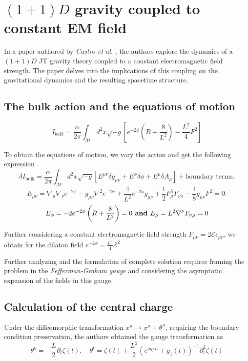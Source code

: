 \section{$(1+1)D$ gravity coupled to constant EM field  \cite{castro2019}}
\label{castro-paper}

In a paper authored by \textit{Castro et al.} \cite{castro2019}, the authors explore the dynamics of a $(1+1)D$ JT gravity theory coupled to a constant electromagnetic field strength. The paper delves into the implications of this coupling on the gravitational dynamics and the resulting spacetime structure. 

\subsection{The bulk action and the equations of motion}
\[ I_{bulk} = \frac{\alpha}{2\pi}\int_{\mathcal{M}}^{} d^2x \sqrt{-g}\left [ e^{-2\phi} \left ( R + \frac{8}{L^2} \right ) - \frac{L^2}{4}F^2 \right]\]

To obtain the equations of motion, we vary the action and get the following expression 
\begin{equation}
    \delta I_{\text{bulk}} = \frac{\alpha}{2\pi} \int_{\mathcal{M}} d^2 x \sqrt{-g} \left[ E^{\mu\nu} \delta g_{\mu\nu} + E^{\phi} \delta \phi + E^{\mu} \delta A_{\mu} \right] + \text{boundary terms}.
\end{equation}
\begin{equation}
    E_{\mu\nu} = \nabla_{\mu}\nabla_{\nu}e^{-2\phi} - g_{\mu\nu}\nabla^2 e^{-2\phi} + \frac{4}{L^2}e^{-2\phi}g_{\mu\nu} + \frac{1}{2}F_{\mu}^{\lambda}F_{\nu\lambda} - \frac{1}{8}g_{\mu\nu}F^2 = 0.
\end{equation}
\begin{equation}
    E_{\phi} = -2e^{-2\phi}\left(R + \frac{8}{L^2}\right)=0 \text{\textbf{ and }} E_{\mu} = L^2\nabla^{\nu}F_{\nu\mu} = 0
\end{equation}

Further considering a constant electromagnetic field strength $F_{\mu\nu} = 2\mathcal{E}\epsilon_{\mu\nu}$, we obtain for the dilaton field $e^{-2\phi}=\displaystyle\frac{L^4}{4}\mathcal{E}^2$

Further analyzing and the formulation of complete solution requires framing the problem in the \textit{Fefferman-Graham gauge} \cite{fefferman1985conformal} and considering the asymptotic expansion of the fields in this gauge. 

\subsection{Calculation of the central charge}
\label{subsec:central-charge-castro}
Under the diffeomorphic transformation $x^{\mu}\to x^{\mu}+\theta^{\mu}$, requiring the boundary condition preservation, the authors obtained the gauge transformation as 
\begin{equation}
    \theta^\eta = -\frac{L}{2}\partial_t\zeta(t), \quad \theta^t = \zeta(t) + \frac{L^2}{2}\left(e^{4\eta/L} + g_1(t)\right)^{-1}\partial_t^2\zeta(t)
\end{equation}


